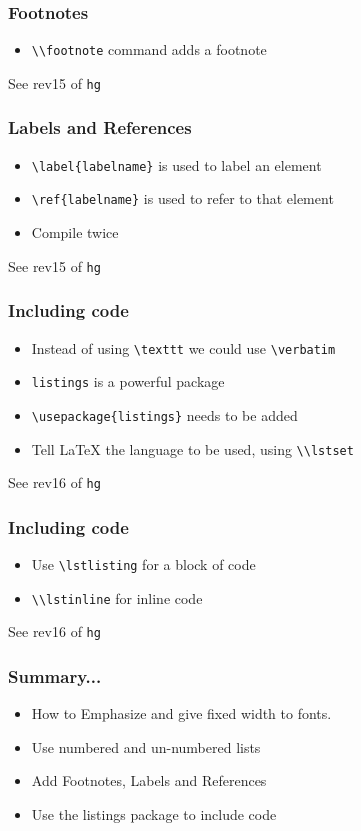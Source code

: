 \documentclass[14pt,compress]{beamer}
\newcommand{\typ}[1]{\lstinline{#1}}
\begin{document}
\begin{frame}[fragile]
  \frametitle{Footnotes}
  \begin{itemize}
  \item \typ{\\footnote} command adds a footnote
  \end{itemize}
  \tiny See rev15 of \typ{hg}
\end{frame}

\begin{frame}[fragile]
  \frametitle{Labels and References}
  \begin{itemize}
  \item \lstinline+\label{labelname}+ is used to label an element
  \item \lstinline+\ref{labelname}+ is used to refer to that element
  \item Compile twice
  \end{itemize}
  \tiny See rev15 of \typ{hg}
\end{frame}

\begin{frame}[fragile]
  \frametitle{Including code}
  \begin{itemize}
  \item Instead of using \lstinline{\texttt} we could use
    \lstinline{\verbatim} 
  \item \lstinline+listings+ is a powerful package
  \item \lstinline+\usepackage{listings}+ needs to be added 
  \item Tell {\LaTeX} the language to be used, using \typ{\\lstset}
  \end{itemize}
  \tiny See rev16 of \typ{hg}
\end{frame}

\begin{frame}[fragile]
  \frametitle{Including code}
  \begin{itemize}
  \item Use \lstinline+\lstlisting+ for a block of code
  \item \typ{\\lstinline} for inline code
  \end{itemize}
  \tiny See rev16 of \typ{hg}
\end{frame}


\begin{frame}[fragile]
	\frametitle{Summary...}
	\begin{itemize}
	Put Quotation Marks around text
	\item How to Emphasize and give fixed width to fonts.
	\item Use numbered and un-numbered lists
	\item Add Footnotes, Labels and References
	\item Use the listings package to include code
	\end{itemize}
\end{frame}
\end{document}

